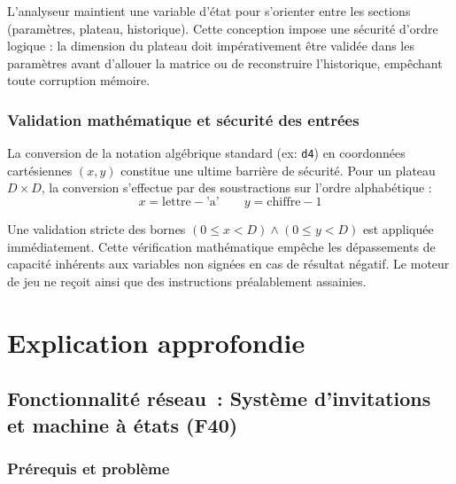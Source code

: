 \documentclass[a4paper]{article}
\begin{document}
L'analyseur maintient une variable d'état pour s'orienter entre les sections (paramètres, plateau, historique). Cette conception impose une sécurité d'ordre logique : la dimension du plateau doit impérativement être validée dans les paramètres avant d'allouer la matrice ou de reconstruire l'historique, empêchant toute corruption mémoire.

\subsubsection{Validation mathématique et sécurité des entrées}
La conversion de la notation algébrique standard (ex: \texttt{d4}) en coordonnées cartésiennes $(x, y)$ constitue une ultime barrière de sécurité. Pour un plateau $D \times D$, la conversion s'effectue par des soustractions sur l'ordre alphabétique :
$$x = \text{lettre} - \text{'a'} \qquad y = \text{chiffre} - 1$$

Une validation stricte des bornes $(0 \le x < D) \land (0 \le y < D)$ est appliquée immédiatement. Cette vérification mathématique empêche les dépassements de capacité inhérents aux variables non signées en cas de résultat négatif. Le moteur de jeu ne reçoit ainsi que des instructions préalablement assainies.


\section{Explication approfondie}
\label{sec:deep}

 
 
 
\subsection{Fonctionnalité réseau~: Système d'invitations et machine à états (F40)}
\label{subsec:network-invitations}
 
\subsubsection{Prérequis et problème}
 
\end{document}

